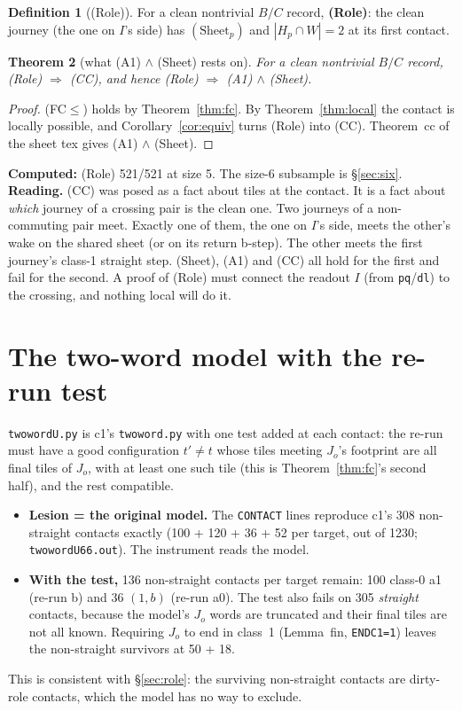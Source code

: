 \documentclass[11pt]{article}
\newtheorem{theorem}{Theorem}\newtheorem{lemma}[theorem]{Lemma}\newtheorem{proposition}[theorem]{Proposition}
\theoremstyle{definition}\newtheorem{definition}[theorem]{Definition}\newtheorem{remark}[theorem]{Remark}
\begin{document}
\begin{definition}[(Role)]
For a clean nontrivial $B/C$ record, \textbf{(Role)}: the clean journey (the one on $I$'s side) has $(\mathrm{Sheet}_p)$ and $|H_p\cap W|=2$ at its first contact.
\end{definition}
\begin{theorem}[what (A1) $\wedge$ (Sheet) rests on]\label{thm:role}
For a clean nontrivial $B/C$ record, (Role) $\Rightarrow$ (CC), and hence (Role) $\Rightarrow$ (A1) $\wedge$ (Sheet).
\end{theorem}
\begin{proof}
(FC$\le$) holds by Theorem~\ref{thm:fc}. By Theorem~\ref{thm:local} the contact is locally possible, and Corollary~\ref{cor:equiv} turns (Role) into (CC). Theorem~cc of the sheet tex gives (A1) $\wedge$ (Sheet).
\end{proof}
\noindent\textbf{Computed:} (Role) 521/521 at size 5. The size-6 subsample is \S\ref{sec:six}.
\textbf{Reading.} (CC) was posed as a fact about tiles at the contact. It is a fact about \emph{which} journey of a crossing pair is the clean one. Two journeys of a non-commuting pair meet. Exactly one of them, the one on $I$'s side, meets the other's wake on the shared sheet (or on its return b-step). The other meets the first journey's class-1 straight step. (Sheet), (A1) and (CC) all hold for the first and fail for the second. A proof of (Role) must connect the readout $I$ (from \texttt{pq}/\texttt{dl}) to the crossing, and nothing local will do it.

\section{The two-word model with the re-run test}\label{sec:tw}
\texttt{twowordU.py} is c1's \texttt{twoword.py} with one test added at each contact: the re-run must have a good configuration $t'\ne t$ whose tiles meeting $J_o$'s footprint are all final tiles of $J_o$, with at least one such tile (this is Theorem~\ref{thm:fc}'s second half), and the rest compatible.
\begin{itemize}
\item \textbf{Lesion = the original model.} The \texttt{CONTACT} lines reproduce c1's 308 non-straight contacts exactly (100 + 120 + 36 + 52 per target, out of 1230; \texttt{twowordU66.out}). The instrument reads the model.
\item \textbf{With the test,} 136 non-straight contacts per target remain: 100 class-0 a1 (re-run b) and 36 $(1,b)$ (re-run a0). The test also fails on 305 \emph{straight} contacts, because the model's $J_o$ words are truncated and their final tiles are not all known. Requiring $J_o$ to end in class~1 (Lemma~fin, \texttt{ENDC1=1}) leaves the non-straight survivors at 50 + 18.
\end{itemize}
This is consistent with \S\ref{sec:role}: the surviving non-straight contacts are dirty-role contacts, which the model has no way to exclude.
\end{document}
